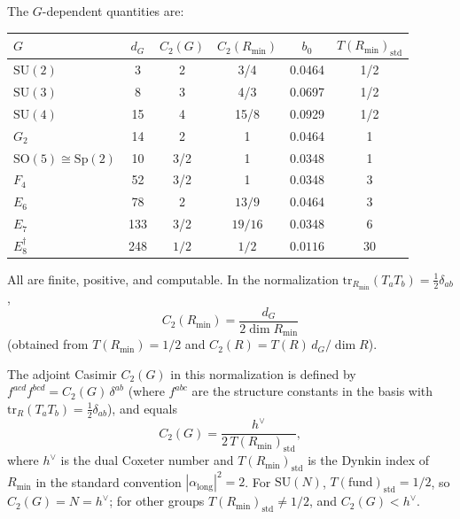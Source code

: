 \documentclass[11pt]{article}
\theoremstyle{definition}
\newcommand{\SU}{\mathrm{SU}}
\newcommand{\tr}{\mathrm{tr}}
\newcommand{\SO}{\mathrm{SO}}
\newcommand{\Sp}{\mathrm{Sp}}
\begin{document}
The $G$-dependent quantities are:

\begin{center}
\renewcommand{\arraystretch}{1.2}
\begin{tabular}{@{}lccccc@{}}
\toprule
$G$ & $d_G$ & $C_2(G)$ & $C_2(R_{\min})$ & $b_0$ &
$T(R_{\min})_{\mathrm{std}}$ \\
\midrule
$\SU(2)$ & 3 & 2 & 3/4 & 0.0464 & 1/2 \\
$\SU(3)$ & 8 & 3 & 4/3 & 0.0697 & 1/2 \\
$\SU(4)$ & 15 & 4 & 15/8 & 0.0929 & 1/2 \\
$G_2$ & 14 & 2 & 1 & 0.0464 & 1 \\
$\SO(5)\cong\Sp(2)$ & 10 & 3/2 & 1 & 0.0348 & 1 \\
$F_4$ & 52 & 3/2 & 1 & 0.0348 & 3 \\
$E_6$ & 78 & 2 & $13/9$ & 0.0464 & 3 \\
$E_7$ & 133 & 3/2 & $19/16$ & 0.0348 & 6 \\
$E_8^{\dag}$ & 248 & $1/2$ & $1/2$ &
$0.0116$ & 30 \\
\bottomrule
\end{tabular}
\end{center}

All are finite, positive, and computable.
In the normalization $\tr_{R_{\min}}(T_a T_b)
=\frac{1}{2}\delta_{ab}$,
\begin{equation}\label{sun-eq:casimir-formula}
C_2(R_{\min})=\frac{d_G}{2\dim R_{\min}}
\end{equation}
(obtained from $T(R_{\min})=1/2$ and
$C_2(R)=T(R)\,d_G/\dim R$).

The adjoint Casimir $C_2(G)$ in this normalization
is defined by $f^{acd}f^{bcd}=C_2(G)\,\delta^{ab}$
(where $f^{abc}$ are the structure constants in the basis
with $\tr_R(T_a T_b)=\frac{1}{2}\delta_{ab}$), and equals
\begin{equation}\label{sun-eq:c2adj-formula}
C_2(G)=\frac{h^\vee}{2\,T(R_{\min})_{\mathrm{std}}},
\end{equation}
where $h^\vee$ is the dual Coxeter number and
$T(R_{\min})_{\mathrm{std}}$ is the Dynkin index
of~$R_{\min}$ in the standard convention
$|\alpha_{\mathrm{long}}|^2=2$.
For $\SU(N)$, $T(\mathrm{fund})_{\mathrm{std}}=1/2$,
so $C_2(G)=N=h^\vee$; for other groups
$T(R_{\min})_{\mathrm{std}}\ne 1/2$, and $C_2(G)<h^\vee$.
\end{document}
